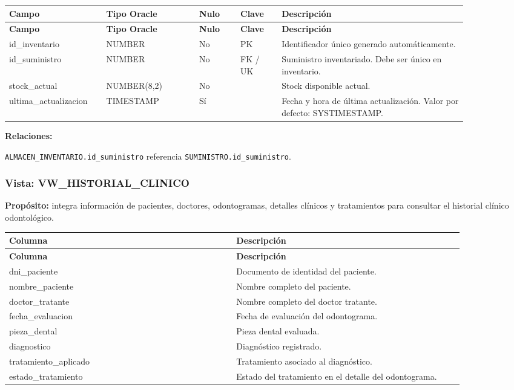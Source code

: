 \begin{longtable}{p{0.18\linewidth}p{0.18\linewidth}p{0.08\linewidth}p{0.08\linewidth}p{0.36\linewidth}}
\toprule
\textbf{Campo} & \textbf{Tipo Oracle} & \textbf{Nulo} & \textbf{Clave} & \textbf{Descripción} \\
\midrule
\endfirsthead
\toprule
\textbf{Campo} & \textbf{Tipo Oracle} & \textbf{Nulo} & \textbf{Clave} & \textbf{Descripción} \\
\midrule
\endhead
id\_inventario & NUMBER & No & PK & Identificador único generado automáticamente. \\
id\_suministro & NUMBER & No & FK / UK & Suministro inventariado. Debe ser único en inventario. \\
stock\_actual & NUMBER(8,2) & No &  & Stock disponible actual. \\
ultima\_actualizacion & TIMESTAMP & Sí &  & Fecha y hora de última actualización. Valor por defecto: SYSTIMESTAMP. \\
\bottomrule
\end{longtable}

\textbf{Relaciones:}\par
\texttt{ALMACEN\_INVENTARIO.id\_suministro} referencia \texttt{SUMINISTRO.id\_suministro}.\par



\subsubsection{Vista: VW\_HISTORIAL\_CLINICO}

\textbf{Propósito:} integra información de pacientes, doctores, odontogramas, detalles clínicos y tratamientos para consultar el historial clínico odontológico.\par

\begin{longtable}{p{0.46\linewidth}p{0.46\linewidth}}
\toprule
\textbf{Columna} & \textbf{Descripción} \\
\midrule
\endfirsthead
\toprule
\textbf{Columna} & \textbf{Descripción} \\
\midrule
\endhead
dni\_paciente & Documento de identidad del paciente. \\
nombre\_paciente & Nombre completo del paciente. \\
doctor\_tratante & Nombre completo del doctor tratante. \\
fecha\_evaluacion & Fecha de evaluación del odontograma. \\
pieza\_dental & Pieza dental evaluada. \\
diagnostico & Diagnóstico registrado. \\
tratamiento\_aplicado & Tratamiento asociado al diagnóstico. \\
estado\_tratamiento & Estado del tratamiento en el detalle del odontograma. \\
\bottomrule
\end{longtable}




